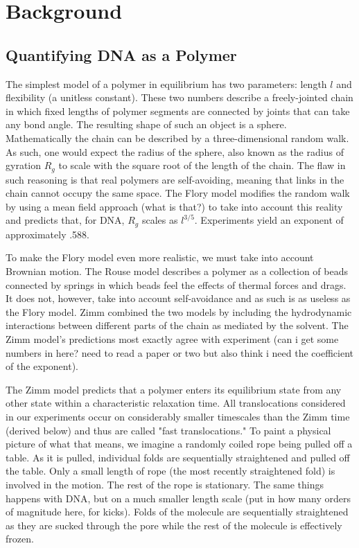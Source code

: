 \documentclass[aps,prl,preprint,groupedaddress]{revtex4}
\begin{document}
\section{Background}

\subsection{Quantifying DNA as a Polymer}

The simplest model of a polymer in equilibrium has two parameters: length \(l\) and flexibility (a unitless constant). These two numbers describe a freely-jointed chain in which fixed lengths of polymer segments are connected by joints that can take any bond angle. The resulting shape of such an object is a sphere. Mathematically the chain can be described by a three-dimensional random walk. As such, one would expect the radius of the sphere, also known as the radius of gyration \(R_g\) to scale with the square root of the length of the chain. The flaw in such reasoning is that real polymers are self-avoiding, meaning that links in the chain cannot occupy the same space. The Flory model modifies the random walk by using a mean field approach (what is that?) to take into account this reality and predicts that, for DNA, \(R_g\) scales as \(l^{3/5}\). Experiments yield an exponent of approximately .588.

To make the Flory model even more realistic, we must take into account Brownian motion. The Rouse model describes a polymer as a collection of beads connected by springs in which beads feel the effects of thermal forces and drags. It does not, however, take into account self-avoidance and as such is as useless as the Flory model. Zimm combined the two models by including the hydrodynamic interactions between different parts of the chain as mediated by the solvent. The Zimm model's predictions most exactly agree with experiment (can i get some numbers in here? need to read a paper or two but also think i need the coefficient of the exponent).

The Zimm model predicts that a polymer enters its equilibrium state from any other state within a characteristic relaxation time. All translocations considered in our experiments occur on considerably smaller timescales than the Zimm time (derived below) and thus are called "fast translocations." To paint a physical picture of what that means, we imagine a randomly coiled rope being pulled off a table. As it is pulled, individual folds are sequentially straightened and pulled off the table. Only a small length of rope (the most recently straightened fold) is involved in the motion. The rest of the rope is stationary. The same things happens with DNA, but on a much smaller length scale (put in how many orders of magnitude here, for kicks). Folds of the molecule are sequentially straightened as they are sucked through the pore while the rest of the molecule is effectively frozen.
\end{document}
